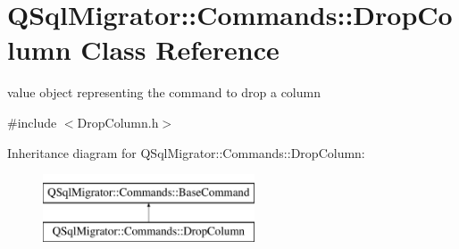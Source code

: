 \hypertarget{class_q_sql_migrator_1_1_commands_1_1_drop_column}{}\section{Q\+Sql\+Migrator\+:\+:Commands\+:\+:Drop\+Column Class Reference}
\label{class_q_sql_migrator_1_1_commands_1_1_drop_column}


value object representing the command to drop a column  




{\ttfamily \#include $<$Drop\+Column.\+h$>$}

Inheritance diagram for Q\+Sql\+Migrator\+:\+:Commands\+:\+:Drop\+Column\+:\begin{figure}[H]
\begin{center}
\leavevmode
\includegraphics[height=2.000000cm]{class_q_sql_migrator_1_1_commands_1_1_drop_column}
\end{center}
\end{figure}
